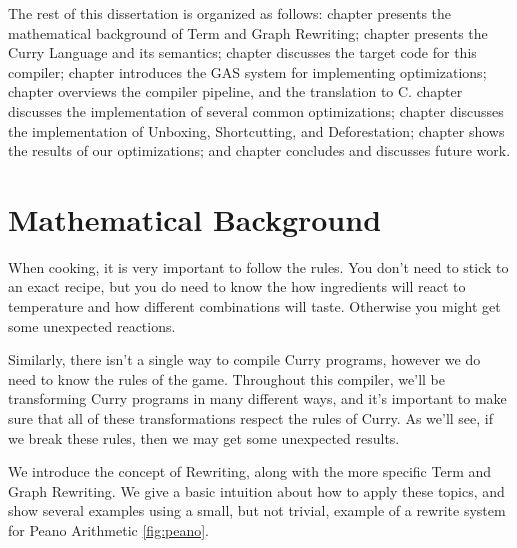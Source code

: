 \documentclass{book}
\theoremstyle{definition}
\begin{document}
The rest of this dissertation is organized as follows:
chapter \label{ch:Mathematical Background} presents the mathematical background of Term and Graph Rewriting;
chapter \label{ch:The Curry Language} presents the Curry Language and its semantics;
chapter \label{ch:The Generated Code} discusses the target code for this compiler;
chapter \label{ch:Generating and Altering Subexpressions} introduces the GAS system for implementing optimizations;
chapter \label{ch:The Compiler Pipeline} overviews the compiler pipeline, and the translation to C.
chapter \label{ch:Basic Optimizations} discusses the implementation of several common optimizations;
chapter \label{ch:Memory Optimizations} discusses the implementation of Unboxing, Shortcutting, and Deforestation;
chapter \label{ch:Results} shows the results of our optimizations;
and chapter \label{ch:Conclusion} concludes and discusses future work.


\mainmatter

\chapter{Mathematical Background} \label{ch:Mathematical Background}


When cooking, it is very important to follow the rules.
You don't need to stick to an exact recipe, 
but you do need to know the how ingredients will react to temperature
and how different combinations will taste.
Otherwise you might get some unexpected reactions.

Similarly, there isn't a single way to compile Curry programs,
however we do need to know the rules of the game.
Throughout this compiler, we'll be transforming Curry programs
in many different ways, and it's important to make sure that all
of these transformations respect the rules of Curry.
As we'll see, if we break these rules, 
then we may get some unexpected results.

We introduce the concept of Rewriting, 
along with the more specific Term and Graph Rewriting.
We give a basic intuition about how to apply these topics,
and show several examples using a small, but not trivial,
example of a rewrite system for Peano Arithmetic \ref{fig:peano}.
\end{document}
